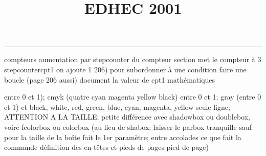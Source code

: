 \documentclass[11pt]{article}%
\title{\bf \vspace{-2cm} EDHEC 2001} %
\author{} %
\date{} %
\renewcommand{\headrulewidth}{0pt}%
\renewcommand{\footrulewidth}{0.4pt}%
\begin{document}
\maketitle %
\vspace{-1.4cm}\hrule %
\thispagestyle{fancy}

\vspace*{.2cm}



compteurs%
aumentation par stepcounter du compteur section%
met le compteur à 3%
stepcounter{cpt1} on ajoute 1%
206) pour subordonner à une condition %
faire une boucle (page 206 aussi) %
document la valeur de cpt1 
mathématiques\newcommand{\ch}{\operatorname{ch}} 
\newcommand{\sh}{\operatorname{sh}}
\renewcommand{\tanh}{\operatorname{th}}
\renewcommand{\sinh}{\operatorname{sh}}
\renewcommand{\cosh}{\operatorname{ch}}
\newcommand{\argsh}{\operatorname{argsh}}
\newcommand{\argch}{\operatorname{argch}}
\newcommand{\argth}{\operatorname{argth}}
\newcommand{\ker}{\operatorname{Ker}}
\renewcommand{\im}{\operatorname{Im}}
\newcommand{\rg}{\operatorname{rg}}
\newcommand{\Id}{\operatorname{Id}}
\newcommand{\id}{\operatorname{id}}
\renewcommand{\leq}{\leq}
\renewcommand{\geq}{\geq }

entre 0 et 1); cmyk (quatre cyan magenta yellow black) entre 0 et 1;
gray (entre 0 et 1) et black, white, red, green, blue, cyan, magenta,
yellow%
seule ligne; ATTENTION A LA TAILLE; petite différence avec shadowbox ou
doublebox, voire fcolorbox ou colorbox (au lieu de shabox; laisser le
parbox tranquille sauf pour la taille de la boîte
\newcommand{\Tbox}[1]{\begin{center} \shabox{\parbox{0.6
\linewidth}{#1}} \end{center}} %
fait le 1er paramètre; entre accolades ce que fait la commande
définition des en-têtes et pieds de pages\pagestyle{fancy}
\chead{}
\rfoot[ \ \thepage]{\thepage}
\cfoot{}
\lfoot{}
\thispagestyle{fancy} %
pied de page)\renewcommand{\footrulewidth}{0.4pt}
\renewcommand{\headrulewidth}{0.4pt}
\end{document}
